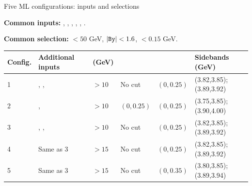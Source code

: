 \begin{frame}[label=p3_20260916]{Five ML configurations: inputs and selections}
  \relax
  {\small
  \textbf{Common inputs:} , , , , , .\par\vspace{0.3em}
  \textbf{Common selection:} $<50$ GeV, $|\var{By}|<1.6$, $<0.15$ GeV.
  }
  \begin{center}\small
  \setlength{\tabcolsep}{3pt}\renewcommand{\arraystretch}{1.00}
  \begin{tabular}{@{}L{1.10cm}L{3.50cm}L{1.30cm}L{1.75cm}L{1.75cm}L{2.25cm}@{}}
    \toprule
    Config. & Additional inputs &  (GeV) &  &  & Sidebands (GeV)\\
     & , ,  & $>10$ & No cut & $(0,0.25)$ & (3.82,3.85); (3.89,3.92)\\
    2 & ,  & $>10$ & $(0,0.25)$ & $(0,0.25)$ & (3.75,3.85); (3.90,4.00)\\
    3 & , ,  & $>10$ & No cut & $(0,0.25)$ & (3.82,3.85); (3.89,3.92)\\
    4 & Same as 3 & $>15$ & No cut & $(0,0.25)$ & (3.82,3.85); (3.89,3.92)\\
    5 & Same as 3 & $>15$ & No cut & $(0,0.35)$ & (3.80,3.85); (3.89,3.94)\\
    \bottomrule
  \end{tabular}
  \end{center}
\end{frame}
